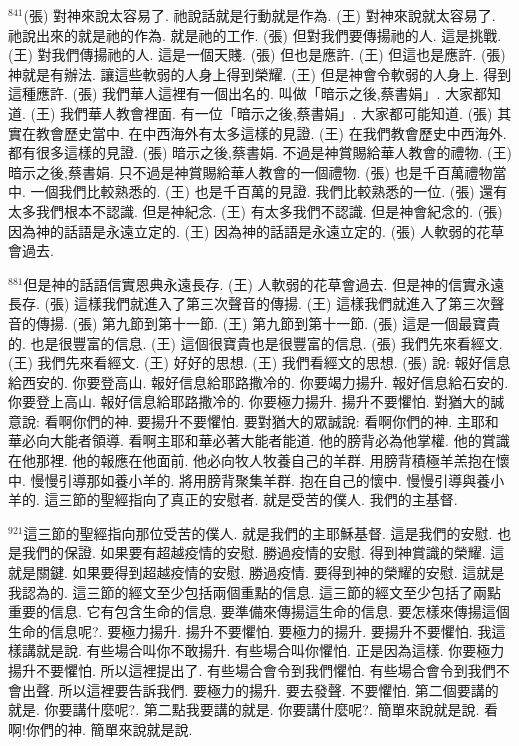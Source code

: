 \documentclass{book}
\begin{document}
$^{841}$(張) 對神來說太容易了.
祂說話就是行動就是作為.
(王) 對神來說就太容易了.
祂說出來的就是祂的作為.
就是祂的工作.
(張) 但對我們要傳揚祂的人.
這是挑戰.
(王) 對我們傳揚祂的人.
這是一個天賤.
(張) 但也是應許.
(王) 但這也是應許.
(張) 神就是有辦法.
讓這些軟弱的人身上得到榮耀.
(王) 但是神會令軟弱的人身上.
得到這種應許.
(張) 我們華人這裡有一個出名的.
叫做「暗示之後,蔡書娟」.
大家都知道.
(王) 我們華人教會裡面.
有一位「暗示之後,蔡書娟」.
大家都可能知道.
(張) 其實在教會歷史當中.
在中西海外有太多這樣的見證.
(王) 在我們教會歷史中西海外.
都有很多這樣的見證.
(張) 暗示之後,蔡書娟.
不過是神賞賜給華人教會的禮物.
(王) 暗示之後,蔡書娟.
只不過是神賞賜給華人教會的一個禮物.
(張) 也是千百萬禮物當中.
一個我們比較熟悉的.
(王) 也是千百萬的見證.
我們比較熟悉的一位.
(張) 還有太多我們根本不認識.
但是神紀念.
(王) 有太多我們不認識.
但是神會紀念的.
(張) 因為神的話語是永遠立定的.
(王) 因為神的話語是永遠立定的.
(張) 人軟弱的花草會過去.

$^{881}$但是神的話語信實恩典永遠長存.
(王) 人軟弱的花草會過去.
但是神的信實永遠長存.
(張) 這樣我們就進入了第三次聲音的傳揚.
(王) 這樣我們就進入了第三次聲音的傳揚.
(張) 第九節到第十一節.
(王) 第九節到第十一節.
(張) 這是一個最寶貴的.
也是很豐富的信息.
(王) 這個很寶貴也是很豐富的信息.
(張) 我們先來看經文.
(王) 我們先來看經文.
(王) 好好的思想.
(王) 我們看經文的思想.
(張) 說: 報好信息給西安的.
你要登高山.
報好信息給耶路撒冷的.
你要竭力揚升.
報好信息給石安的.
你要登上高山.
報好信息給耶路撒冷的.
你要極力揚升.
揚升不要懼怕.
對猶大的誠意說: 看啊你們的神.
要揚升不要懼怕.
要對猶大的眾誠說: 看啊你們的神.
主耶和華必向大能者領導.
看啊主耶和華必著大能者能道.
他的膀背必為他掌權.
他的賞識在他那裡.
他的報應在他面前.
他必向牧人牧養自己的羊群.
用膀背積極羊羔抱在懷中.
慢慢引導那如養小羊的.
將用膀背聚集羊群.
抱在自己的懷中.
慢慢引導與養小羊的.
這三節的聖經指向了真正的安慰者.
就是受苦的僕人.
我們的主基督.

$^{921}$這三節的聖經指向那位受苦的僕人.
就是我們的主耶穌基督.
這是我們的安慰.
也是我們的保證.
如果要有超越疫情的安慰.
勝過疫情的安慰.
得到神賞識的榮耀.
這就是關鍵.
如果要得到超越疫情的安慰.
勝過疫情.
要得到神的榮耀的安慰.
這就是我認為的.
這三節的經文至少包括兩個重點的信息.
這三節的經文至少包括了兩點重要的信息.
它有包含生命的信息.
要準備來傳揚這生命的信息.
要怎樣來傳揚這個生命的信息呢?.
要極力揚升.
揚升不要懼怕.
要極力的揚升.
要揚升不要懼怕.
我這樣講就是說.
有些場合叫你不敢揚升.
有些場合叫你懼怕.
正是因為這樣.
你要極力揚升不要懼怕.
所以這裡提出了.
有些場合會令到我們懼怕.
有些場合會令到我們不會出聲.
所以這裡要告訴我們.
要極力的揚升.
要去發聲.
不要懼怕.
第二個要講的就是.
你要講什麼呢?.
第二點我要講的就是.
你要講什麼呢?.
簡單來說就是說.
看啊!你們的神.
簡單來說就是說.
\end{document}
